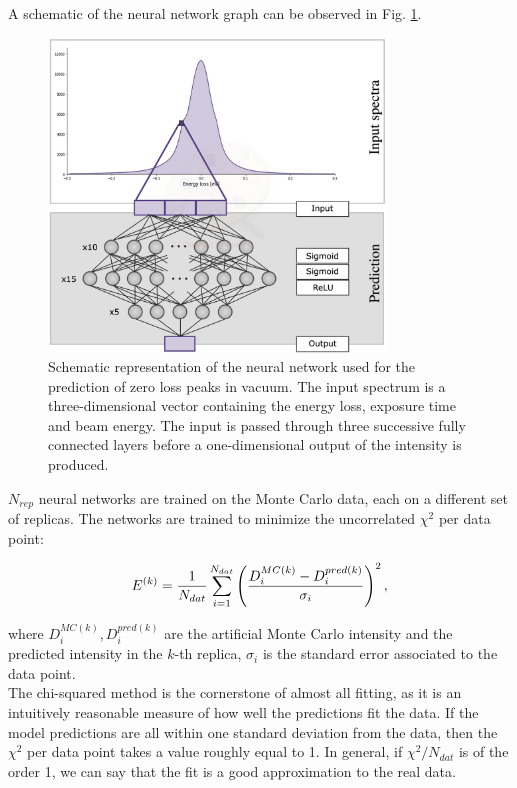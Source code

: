 \documentclass[11pt,a4paper]{article}
\def\frac#1#2{{{#1}\over {#2}}}
\numberwithin{equation}{section}
\numberwithin{figure}{section}
\numberwithin{table}{section}
\begin{document}
A schematic of the neural network graph can be observed in Fig. \ref{architecture}. 
\begin{figure}[H]
    \centering
    \includegraphics[width=90mm]{plots/architecture.jpg}
    \caption{Schematic representation of the neural network used for the prediction of zero loss peaks in vacuum. The input spectrum is a three-dimensional vector containing the energy loss, exposure time and beam energy. The input is passed through three successive fully connected layers before a one-dimensional output of the intensity is produced.}
    \label{architecture}
\end{figure}

$N_{rep}$ neural networks are trained on the Monte Carlo data, each on a different set of replicas. The networks are trained to minimize the uncorrelated $\chi^2$ per data point:

\begin{equation} \label{eq:chi2}
    E^{(k)} = \frac{1}{N_{dat}}\sum_{i=1}^{N_{dat}}\left(\frac{D_i^{MC(k)} - D_i^{pred(k)}}{\sigma_i}\right)^2, 
\end{equation}

where $D_i^{MC(k)}, D_i^{pred(k)}$ are the artificial Monte Carlo intensity and the predicted intensity in the $k$-th replica, $\sigma_i$ is the standard error associated to the data point. \\
The chi-squared method is the cornerstone of almost all fitting, as it is an intuitively reasonable measure of how well the predictions fit the data. If the model predictions are all within one standard deviation from the data, then the $\chi^2$ per data point takes a value roughly equal to 1. In general, if $\chi^2/N_{dat}$ is of the order 1, we can say that the fit is a good approximation to the real data. \\
\end{document}
